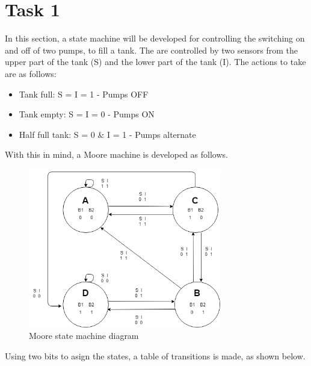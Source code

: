\newpage
\section*{Task 1}

In this section, a state machine will be 
developed for controlling the switching
on and off of two pumps, to fill a tank.
The are controlled by two sensors from 
the upper part of the tank (S) and the 
lower part of the tank (I). The actions
to take are as follows:

\begin{itemize}
    \item Tank full: S = I = 1 - Pumps OFF
    \item Tank empty: S = I = 0 - Pumps ON
    \item Half full tank: S = 0 \& I = 1 - Pumps alternate 
\end{itemize}

With this in mind, a Moore machine is 
developed as follows.

\begin{figure}[H]
    \begin{centering}
    \includegraphics[width=0.75\textwidth]{data/Graficos1/1a_fsm.png}
    \par\end{centering}
    \caption{Moore state machine diagram}
\end{figure}

Using two bits to asign the states, a table 
of transitions is made, as shown below.

